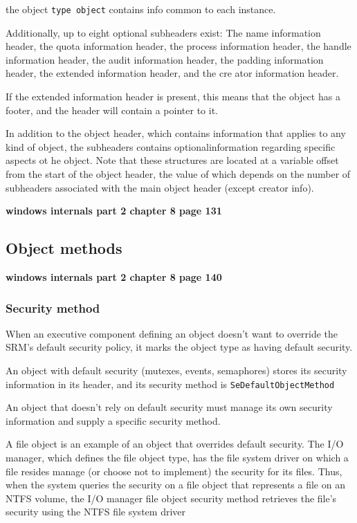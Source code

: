 the object \verb+type object+ contains info common to each instance.

Additionally, up to eight optional subheaders exist: The name information header, the quota information header, the process information header, the handle information header, the audit information header, the padding information header, the extended information header, and the cre ator information header. 

If the extended information header is present, this means that the object has a footer, and the header will contain a pointer to it.

In addition to the object header, which contains information that applies to any kind of object, the subheaders contains optionalinformation regarding specific aspects ot he object. Note that these  structures are located at a variable offset from the start of the object header, the value of which depends on the number of subheaders associated with the main object header (except creator info).


{\bf windows internals part 2 chapter 8 page 131}

\subsection{Object methods}

{\bf windows internals part 2 chapter 8 page 140}

\subsubsection{Security method}
When an executive component defining an object doesn’t want to override the SRM’s default security policy, it marks the object type as having default security.


An object with default security (mutexes, events, semaphores) stores its security information in its header, and its security method is \verb+SeDefaultObjectMethod+

An object that doesn’t rely on default security must manage its own security information and supply a specific
security method.

A file object is an example of an object that overrides default security. The I/O manager, which defines the file object type, has the file system driver on which a file resides manage (or choose not to implement) the security for its files. Thus, when the system queries the security on a file object that represents a file on an NTFS volume, the I/O manager file object security method retrieves the file’s security using the NTFS file system driver

